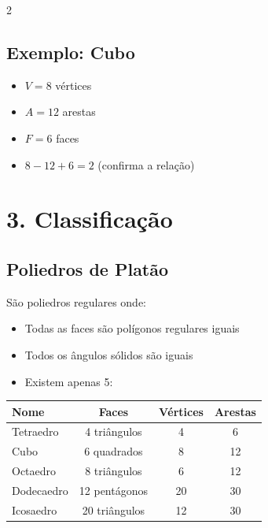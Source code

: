 \documentclass[11pt]{article}
\begin{document}
\begin{multicols}{2}
\subsection*{Exemplo: Cubo}
\begin{itemize}
    \item $V = 8$ vértices
    \item $A = 12$ arestas
    \item $F = 6$ faces
    \item $8 - 12 + 6 = 2$ (confirma a relação)
\end{itemize}

\begin{center}
\end{center}

\section*{3. Classificação}
\subsection*{Poliedros de Platão}
São poliedros regulares onde:
\begin{itemize}
    \item Todas as faces são polígonos regulares iguais
    \item Todos os ângulos sólidos são iguais
    \item Existem apenas 5:
\end{itemize}

\begin{center}
\begin{tabular}{|l|c|c|c|}
\hline
Nome & Faces & Vértices & Arestas \\
\hline
Tetraedro & 4 triângulos & 4 & 6 \\
Cubo & 6 quadrados & 8 & 12 \\
Octaedro & 8 triângulos & 6 & 12 \\
Dodecaedro & 12 pentágonos & 20 & 30 \\
Icosaedro & 20 triângulos & 12 & 30 \\
\hline
\end{tabular}
\end{center}


\end{multicols}
\end{document}
